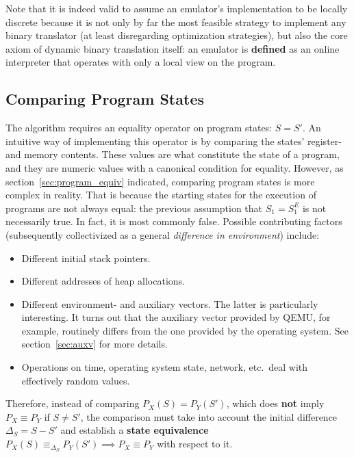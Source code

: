 Note that it is indeed valid to assume an emulator's implementation to be locally discrete because it is not only by far
the most feasible strategy to implement any binary translator (at least disregarding optimization strategies), but also
the core axiom of dynamic binary translation itself: an emulator is \textbf{defined} as an online interpreter that
operates with only a local view on the program.

\subsection{Comparing Program States}\label{sec:comparison}

The algorithm requires an equality operator on program states: $S = S'$. An intuitive way of implementing this operator
is by comparing the states' register- and memory contents. These values are what constitute the state of a program, and
they are numeric values with a canonical condition for equality. However, as section~\ref{sec:program_equiv} indicated,
comparing program states is more complex in reality. That is because the starting states for the execution of programs
are not always equal: the previous assumption that $S_1 = S^E_1$ is not necessarily true. In fact, it is most commonly
false.  Possible contributing factors (subsequently collectivized as a general \textit{difference in environment})
include:

\begin{itemize}
    \item Different initial stack pointers.
    \item Different addresses of heap allocations.
    \item Different environment- and auxiliary vectors. The latter is particularly interesting. It turns out that
        the auxiliary vector provided by QEMU, for example, routinely differs from the one provided by the operating
        system. See section~\ref{sec:auxv} for more details.
    \item Operations on time, operating system state, network, etc.\ deal with effectively random values.
\end{itemize}

Therefore, instead of comparing $P_X(S) = P_Y(S')$, which does \textbf{not} imply $P_X \equiv P_Y$ if $S \neq S'$, the
comparison must take into account the initial difference $\Delta_S = S - S'$ and establish a \textbf{state equivalence}
$P_X(S) \equiv_{\Delta_S} P_Y(S') \implies P_X \equiv P_Y$ with respect to it.

